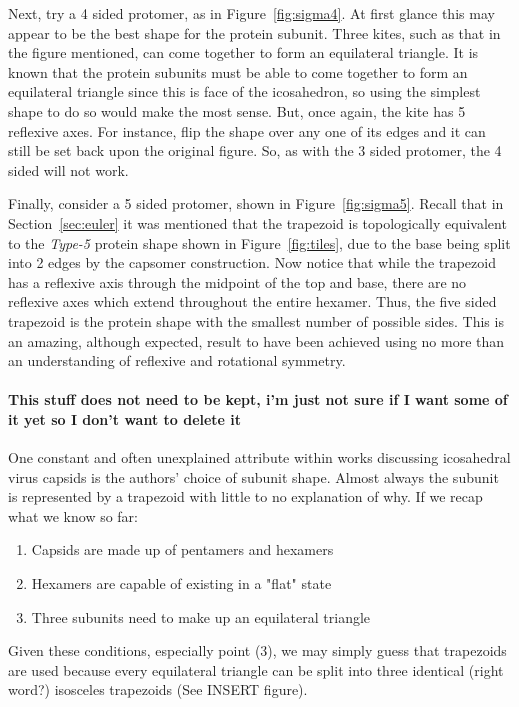 \documentclass[12pt,letter]{article}
\begin{document}
Next, try a 4 sided protomer, as in Figure~\ref{fig:sigma4}. At first glance this may appear to be the best shape for the protein subunit. Three kites, such as that in the figure mentioned, can come together to form an equilateral triangle. It is known that the protein subunits must be able to come together to form an equilateral triangle since this is face of the icosahedron, so using the simplest shape to do so would make the most sense. But, once again, the kite has 5 reflexive axes. For instance, flip the shape over any one of its edges and it can still be set back upon the original figure. So, as with the 3 sided protomer, the 4 sided will not work.

Finally, consider a 5 sided protomer, shown in Figure~\ref{fig:sigma5}. Recall that in Section~\ref{sec:euler} it was mentioned that the trapezoid is topologically equivalent to the \textit{Type-5} protein shape shown in Figure~\ref{fig:tiles}, due to the base being split into 2 edges by the capsomer construction. Now notice that while the trapezoid has a reflexive axis through the midpoint of the top and base, there are no reflexive axes which extend throughout the entire hexamer. Thus, the five sided trapezoid is the protein shape with the smallest number of possible sides. This is an amazing, although expected, result to have been achieved using no more than an understanding of reflexive and rotational symmetry. 


\paragraph{This stuff does not need to be kept, i'm just not sure if I want some of it yet so I don't want to delete it}
One constant and often unexplained attribute within works discussing icosahedral virus capsids is the authors' choice of subunit shape. Almost always the subunit is represented by a trapezoid with little to no explanation of why. If we recap what we know so far:
\begin{enumerate}
	\item Capsids are made up of pentamers and hexamers
	\item Hexamers are capable of existing in a "flat" state
	\item Three subunits need to make up an equilateral triangle
\end{enumerate}
Given these conditions, especially point (3), we may simply guess that trapezoids are used because every equilateral triangle can be split into three identical (right word?) isosceles trapezoids (See INSERT figure). 
\end{document}
